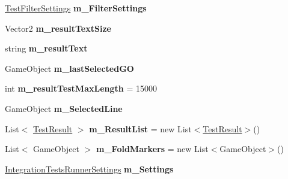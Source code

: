 \begin{DoxyCompactItemize}
\hyperlink{class_unity_test_1_1_test_filter_settings}{Test\+Filter\+Settings} {\bfseries m\+\_\+\+Filter\+Settings}
\item 
\mbox{\label{class_unity_test_1_1_integration_tests_runner_window_afc3be0556f0bfdc8b30dc222ae4b1bc6}} 
Vector2 {\bfseries m\+\_\+result\+Text\+Size}
\item 
\mbox{\label{class_unity_test_1_1_integration_tests_runner_window_af92b1a43d7bf77e8faf45b2eff44fb2b}} 
string {\bfseries m\+\_\+result\+Text}
\item 
\mbox{\label{class_unity_test_1_1_integration_tests_runner_window_a1d81c8da9cd55036bfbad0d845784207}} 
Game\+Object {\bfseries m\+\_\+last\+Selected\+GO}
\item 
\mbox{\label{class_unity_test_1_1_integration_tests_runner_window_a0a1f01910d1dbd6dfd24a9ed8fcdb545}} 
int {\bfseries m\+\_\+result\+Test\+Max\+Length} = 15000
\item 
\mbox{\label{class_unity_test_1_1_integration_tests_runner_window_a4544ad31b5966f6e65774623bb345e08}} 
Game\+Object {\bfseries m\+\_\+\+Selected\+Line}
\item 
\mbox{\label{class_unity_test_1_1_integration_tests_runner_window_a8c34f962c953bf7e2ee8cf39020d0655}} 
List$<$ \hyperlink{class_unity_test_1_1_test_result}{Test\+Result} $>$ {\bfseries m\+\_\+\+Result\+List} = new List$<$\hyperlink{class_unity_test_1_1_test_result}{Test\+Result}$>$()
\item 
\mbox{\label{class_unity_test_1_1_integration_tests_runner_window_a8316ef8fe28bce1441542aa44a703d4a}} 
List$<$ Game\+Object $>$ {\bfseries m\+\_\+\+Fold\+Markers} = new List$<$Game\+Object$>$()
\item 
\mbox{\label{class_unity_test_1_1_integration_tests_runner_window_a98c6909e53a5ce12c8f02eb404d15086}} 
\hyperlink{class_unity_test_1_1_integration_tests_runner_settings}{Integration\+Tests\+Runner\+Settings} {\bfseries m\+\_\+\+Settings}
\end{DoxyCompactItemize}
